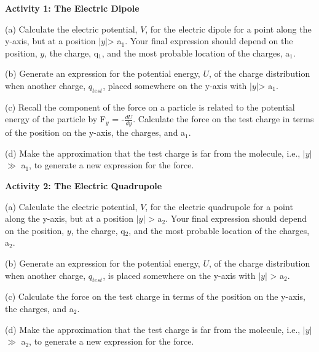 \textbf{Activity 1: The Electric Dipole }

(a) Calculate the electric potential, \( V \), for the electric dipole for
a point along the y-axis, but at a position \( \left| y\right|  \)>
a\( _{1} \). Your final expression should depend on the position,
\( y \), the charge, q\( _{1} \), and the most probable location of the
charges, a\( _{1} \).
\vspace{40mm}

(b) Generate an expression for the potential energy, \( U \), of the charge
distribution when another charge, $q_{test}$,  placed somewhere
on the y-axis with \( \left| y\right|  \)> a\( _{1} \).
\vspace{40mm}

(c) Recall the component of the force on a particle is related to
the potential energy of the particle by F\( _{y} \) = -\( \frac{dU}{dy} \).
Calculate the force on the test charge in terms of the position on
the y-axis, the charges, and a\( _{1} \).
\vspace{40mm}

(d) Make the approximation that the test charge is far from the molecule,
i.e., \( \left| y\right|  \) \( \gg  \) a\( _{1} \), to generate
a new expression for the force.
\vspace{40mm}

\textbf{Activity 2: The Electric Quadrupole} 

(a) Calculate the electric potential, \( V \), for the electric quadrupole
for a point along the y-axis, but at a position \( \left| y\right|  \)
> a\( _{2} \). Your final expression should depend on the position,
\( y \), the charge, q\( _{2} \), and the most probable location of the
charges, a\( _{2} \).
\vspace{40mm}

(b) Generate an expression for the potential energy, \( U \), of the charge
distribution when another charge, $q_{test}$, is placed somewhere
on the y-axis with \( \left| y\right|  \) > a\( _{2} \).
\vspace{40mm}

(c) Calculate the force on the test charge in terms of the position
on the y-axis, the charges, and a\( _{2} \).
\vspace{40mm}

(d) Make the approximation that the test charge is far from the molecule,
i.e., \( \left| y\right|  \) \( \gg  \) a\( _{2} \), to generate
a new expression for the force.
\vspace{40mm}

